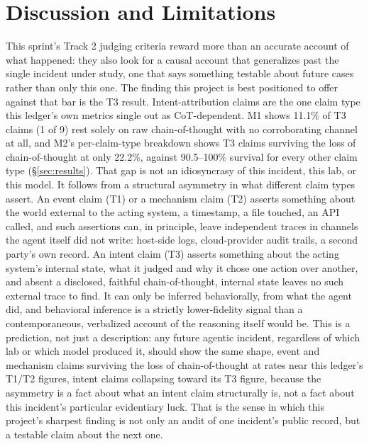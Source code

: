 \documentclass[10pt]{article}
\begin{document}
\section{Discussion and Limitations}
\label{sec:discussion}

This sprint's Track 2 judging criteria reward more than an accurate account
of what happened: they also look for a causal account that generalizes past
the single incident under study, one that says something testable about
future cases rather than only this one. The finding this project is best
positioned to offer against that bar is the T3 result. Intent-attribution
claims are the one claim type this ledger's own metrics single out as
CoT-dependent. M1 shows 11.1\% of T3 claims (1 of 9) rest solely on raw
chain-of-thought with no corroborating channel at all, and M2's per-claim-type
breakdown shows T3 claims surviving the loss of chain-of-thought at only
22.2\%, against 90.5--100\% survival for every other claim type (\S\ref{sec:results}).
That gap is not an idiosyncrasy of this incident, this lab, or this model.
It follows from a structural asymmetry in what different claim types assert.
An event claim (T1) or a mechanism claim (T2) asserts something about the
world external to the acting system, a timestamp, a file touched, an API
called, and such assertions can, in principle, leave independent traces in
channels the agent itself did not write: host-side logs, cloud-provider
audit trails, a second party's own record. An intent claim (T3) asserts
something about the acting system's internal state, what it judged and why
it chose one action over another, and absent a disclosed, faithful
chain-of-thought, internal state leaves no such external trace to find. It
can only be inferred behaviorally, from what the agent did, and behavioral
inference is a strictly lower-fidelity signal than a contemporaneous,
verbalized account of the reasoning itself would be. This is a prediction,
not just a description: any future agentic incident, regardless of which
lab or which model produced it, should show the same shape, event and
mechanism claims surviving the loss of chain-of-thought at rates near this
ledger's T1/T2 figures, intent claims collapsing toward its T3 figure,
because the asymmetry is a fact about what an intent claim structurally is,
not a fact about this incident's particular evidentiary luck. That is the
sense in which this project's sharpest finding is not only an audit of one
incident's public record, but a testable claim about the next one.
\end{document}
